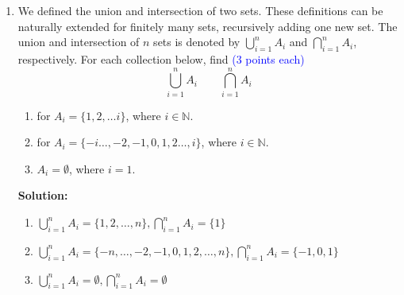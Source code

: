 \documentclass{article}
\newcommand{\pte}[1]{\textcolor{blue}{(#1 points each)}}
\newenvironment{solution}
{
\par
\color{blue}
\textbf{Solution:}
}
{
\par
}
\begin{document}
\begin{enumerate}
    \item
    We defined the union and intersection of two sets. These definitions can be naturally extended for finitely many sets, recursively adding one new set. The union and intersection of $n$ sets is denoted by $\bigcup_{i = 1}^{n} A_{i}$ and $\bigcap_{i = 1}^{n} A_{i}$, respectively.
    For each collection below, find \pte{3} $$\bigcup_{i = 1}^{n} A_{i} \qquad \bigcap_{i = 1}^{n} A_{i}$$
    \begin{enumerate}
        \item for $A_{i} = \{1, 2, \dots i\}$, where $i \in \mathbb{N}$.
        \item for $A_{i} = \{-i \dots, -2, -1, 0, 1, 2 \dots, i\}$, where $i \in \mathbb{N}$. 
        \item $A_{i} = \emptyset$, where $i = 1$. 
    \end{enumerate}
    \begin{solution}
    \begin{enumerate}
        \item $\bigcup_{i = 1}^{n} A_{i} = \{1, 2, \dots, n\}, \bigcap_{i = 1}^{n} A_{i} = \{1\}$
        \item $\bigcup_{i = 1}^{n} A_{i} = \{-n, \dots, -2, -1, 0, 1, 2, \dots, n\}, \bigcap_{i = 1}^{n} A_{i} = \{-1, 0, 1\}$
        \item $\bigcup_{i = 1}^{n} A_{i} = \emptyset, \bigcap_{i = 1}^{n} A_{i} = \emptyset$
    \end{enumerate}
    \end{solution}
    

\end{enumerate}
\end{document}

